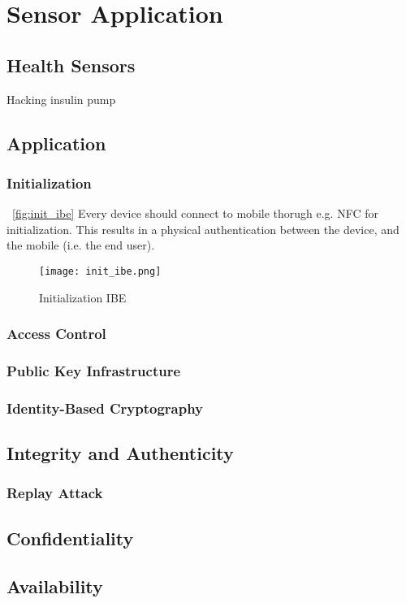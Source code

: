 \chapter{Sensor Application}

\section{Health Sensors}
Hacking insulin pump~\cite{radcliffe2011hacking}
\section{Application}

\subsection{Initialization}
~\autoref{fig:init_ibe}
Every device should connect to mobile thorugh e.g. \gls{NFC} for initialization.
This results in a physical authentication between the device, and the mobile (i.e. the end user).
\begin{figure}[ht]
  \centering
  \texttt{[image: init\_ibe.png]}
  \caption{Initialization IBE}
  \label{fig:init_ibe}
\end{figure}



\subsection{Access Control}

\subsection{Public Key Infrastructure}

\subsection{Identity-Based Cryptography}

\section{Integrity and Authenticity}

\subsection{Replay Attack}

\section{Confidentiality}

\section{Availability}
